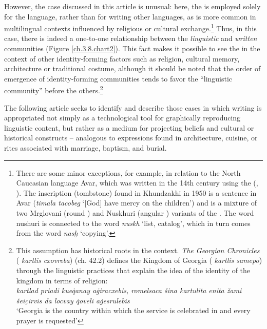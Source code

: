 \documentclass[output=paper,colorlinks,citecolor=brown,arabicfont,georgian]{langscibook}
\begin{document}
However, the case discussed in this article is unusual: here, the   is employed solely for the  language, rather than for writing other languages, as is more common in multilingual contexts influenced by religious or cultural exchange.\footnote{%
There are some minor exceptions, for example, in relation to the North Caucasian language Avar, which was written in the 14th century using the   (\citealt[321--327]{chikobava1940}, \citealt[185--196]{gudava1954}). The inscription (tombstone) found in Khundzakhi in 1950 is a sentence in Avar (\textit{timala tacobeg} `[God] have mercy on the children') and is a mixture of two Mrglovani (round ) and Nuskhuri (angular ) variants of the  .  The word nushuri is connected to the  word  \textit{nuskh} `list, catalog', which in turn comes from the  word  \textit{nasḫ} `copying'.} 
Thus, in this case, there is indeed a one-to-one relationship between the \textit{linguistic} and \textit{written} communities (Figure \ref{ch.3.8.chart2}). This fact makes it possible to see the   in the context of other identity-forming factors such as religion, cultural memory, architecture or traditional costume, although it should be noted that the order of emergence of identity-forming communities tends to favor the ``linguistic community'' before the others.\footnote{%
This assumption has historical roots in the  context. \textit{The Georgian Chronicles} ( \textit{kartlis cxovreba}) (ch. 42.2)
defines the Kingdom of Georgia ( \textit{kartlis samepo}) through the linguistic practices that explain the idea of the identity of the kingdom in terms of religion:
\ea
{}\\
\textit{kartlad priadi kueq̇anay aġiracxebis, romelsaca šina kartulita enita žami šeic̣irvis da locvay q̇oveli aġesrulebis}\\
`Georgia is the country within which the service is celebrated in  and every prayer is requested'
\z}

The following article seeks to identify and describe those cases in which writing is appropriated not simply as a technological tool for graphically reproducing linguistic content, but rather as a medium for projecting beliefs and cultural or historical constructs -- analogous to expressions found in architecture, cuisine, or rites associated with marriage, baptism, and burial. 
\end{document}
